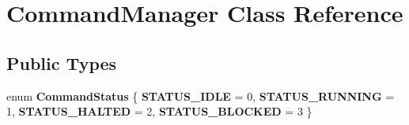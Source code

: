 \hypertarget{classCommandManager}{}\section{Command\+Manager Class Reference}
\label{classCommandManager}
\subsection*{Public Types}
\begin{DoxyCompactItemize}
\item 
\mbox{\label{classCommandManager_ac2f0d9368b3715d8992c2773d6d3cdea}} 
enum {\bfseries Command\+Status} \{ {\bfseries S\+T\+A\+T\+U\+S\+\_\+\+I\+D\+LE} = 0, 
{\bfseries S\+T\+A\+T\+U\+S\+\_\+\+R\+U\+N\+N\+I\+NG} = 1, 
{\bfseries S\+T\+A\+T\+U\+S\+\_\+\+H\+A\+L\+T\+ED} = 2, 
{\bfseries S\+T\+A\+T\+U\+S\+\_\+\+B\+L\+O\+C\+K\+ED} = 3
 \}
\end{DoxyCompactItemize}
